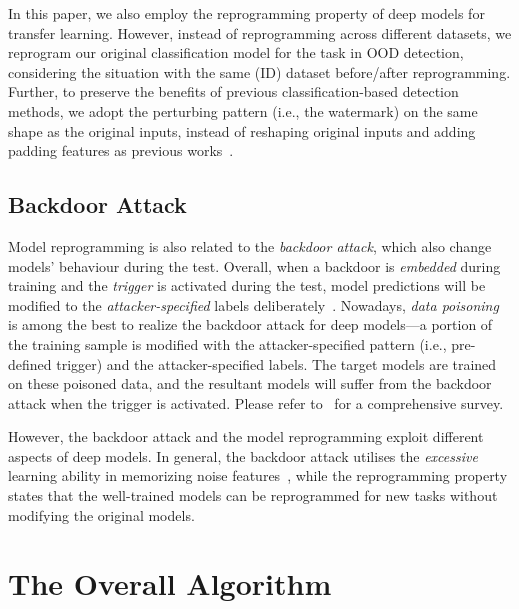 \documentclass{article}
\begin{document}
In this paper, we also employ the reprogramming property of deep models for transfer learning. However, instead of reprogramming across different datasets, we reprogram our original classification model for the task in OOD detection, considering the situation with the same (ID) dataset before/after reprogramming. Further, to preserve the benefits of previous classification-based detection methods, we adopt the perturbing pattern (i.e., the watermark) on the same shape as the original inputs, instead of reshaping original inputs and adding padding features as previous works~\cite{elsayed2018adversarial,YangTC21}. 

\subsection{Backdoor Attack}

Model reprogramming is also related to the \emph{backdoor attack}, which also change models' behaviour during the test. Overall, when a backdoor is \emph{embedded} during training and the \emph{trigger} is activated during the test, model predictions will be modified to the \emph{attacker-specified} labels deliberately~\cite{GuLDG19}. Nowadays, \emph{data poisoning}~\cite{GuLDG19,li2021invisible,LiuM0020,SahaSP20} is among the best to realize the backdoor attack for deep models---a portion of the training sample is modified with the attacker-specified pattern (i.e., pre-defined trigger) and the attacker-specified labels. The target models are trained on these poisoned data, and the resultant models will suffer from the backdoor attack when the trigger is activated. Please refer to~\cite{li2020backdoor} for a comprehensive survey. 

However, the backdoor attack and the model reprogramming exploit different aspects of deep models. In general, the backdoor attack utilises the \emph{excessive} learning ability in memorizing noise features~\cite{li2020backdoor}, while the reprogramming property states that the well-trained models can be reprogrammed for new tasks without modifying the original models. 

\section{The Overall Algorithm} \label{sec: app alg}
\end{document}
